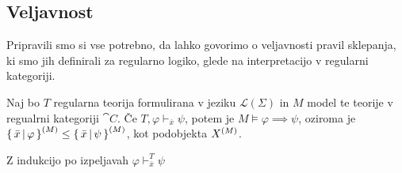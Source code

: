 \documentclass[../kategoricna_logika.tex]{subfiles}
\begin{document}
\subsection{Veljavnost}
Pripravili smo si vse potrebno, da lahko govorimo o veljavnosti pravil sklepanja, ki smo jih definirali za regularno logiko,
glede na interpretacijo v regularni kategoriji.
\begin{izrek}[Veljavnost]
  Naj bo $T$ regularna teorija formulirana v jeziku $\mathcal{L}(\Sigma)$ in $M$ model te teorije v regualrni kategoriji $\cat{C}$.
  Če $T, \varphi \vdash_{\bar{x}} \psi$, potem je $M \models \varphi \implies \psi$,
  oziroma je $\left\lbrace\,\bar{x} \,\middle|\, \varphi\,\right\rbrace^{(M)} \leq \left\lbrace\,\bar{x} \,\middle|\, \psi\,\right\rbrace^{(M)}$, kot podobjekta ${X}^{(M)}$.
\end{izrek}
\begin{dokaz}
  Z indukcijo po izpeljavah $\varphi \vdash_{\bar{x}}^{T} \psi$
\end{dokaz}
%
\end{document}
